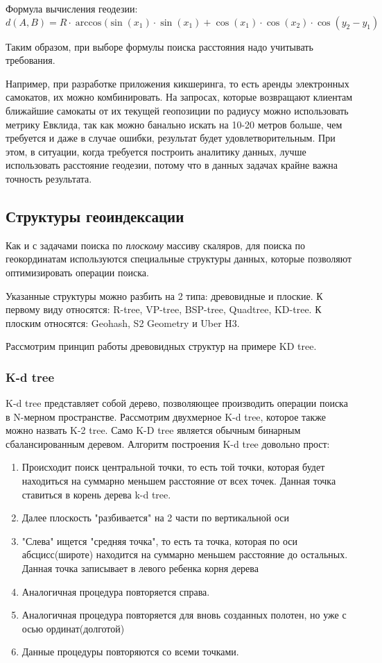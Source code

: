 Формула вычисления геодезии:
$$
d(A, B) = R \cdot \arccos(\sin(x_1) \cdot \sin(x_1) + \cos(x_1) \cdot \cos(x_2) \cdot \cos(y_2 - y_1)
$$

Таким образом, при выборе формулы поиска расстояния надо учитывать требования.

Например, при разработке приложения кикшеринга, то есть аренды электронных самокатов, их можно комбинировать. На запросах, которые возвращают клиентам ближайшие самокаты от их текущей геопозиции по радиусу можно использовать метрику Евклида, так как можно банально искать на 10-20 метров больше, чем требуется и даже в случае ошибки, результат будет удовлетворительным.
При этом, в ситуации, когда требуется построить аналитику данных, лучше использовать расстояние геодезии, потому что в данных задачах крайне важна точность результата.

\subsection{Структуры геоиндексации}
Как и с задачами поиска по \textit{плоскому} массиву скаляров, для поиска по геокординатам используются специальные структуры данных, которые позволяют оптимизировать операции поиска.

Указанные структуры можно разбить на 2 типа: древовидные и плоские. К первому виду относятся: R-tree, VP-tree, BSP-tree, Quadtree, KD-tree. К плоским относятся: Geohash, S2 Geometry и Uber H3.

Рассмотрим принцип работы древовидных структур на примере KD tree.

\subsubsection{K-d tree}
K-d tree представляет собой дерево, позволяющее производить операции поиска в N-мерном пространстве. Рассмотрим двухмерное K-d tree, которое также можно назвать K-2 tree.
Само K-D tree является обычным бинарным сбалансированным деревом.
Алгоритм построения K-d tree довольно прост:
\begin{enumerate}
    \item Происходит поиск центральной точки, то есть той точки, которая будет находиться на суммарно меньшем расстояние от всех точек. Данная точка ставиться в корень дерева k-d tree.
    \item Далее плоскость "разбивается" на 2 части по вертикальной оси
    \item "Слева" ищется "средняя точка", то есть та точка, которая по оси абсцисс(широте) находится на суммарно меньшем расстояние до остальных. Данная точка записывает в левого ребенка корня дерева
    \item Аналогичная процедура повторяется справа.
    \item Аналогичная процедура повторяется для вновь созданных полотен, но уже с осью ординат(долготой)
    \item Данные процедуры повторяются со всеми точками.
\end{enumerate}

